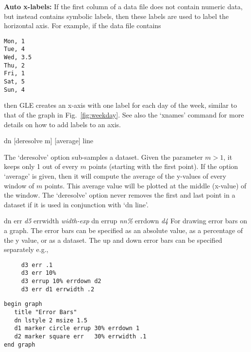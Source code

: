 \begin{commanddescription}
{\bf Auto x-labels:} If the first column of a data file does not contain numeric data, but instead contains symbolic labels, then these labels are used to label the horizontal axis. For example, if the data file contains

\begin{Verbatim}
Mon, 1
Tue, 4
Wed, 3.5
Thu, 2
Fri, 1
Sat, 5
Sun, 4
\end{Verbatim}

\noindent{}then GLE creates an x-axis with one label for each day of the week, similar to that of the graph in Fig.~\ref{fig:weekday}. See also the `{\sf xnames}' command for more details on how to add labels to an axis.


\item[{\sf dn [deresolve m] [average] line}]

The `{\sf deresolve}' option sub-samples a dataset. Given the parameter $m > 1$, it keeps only 1 out of every $m$ points (starting with the first point). If the option `{\sf average}' is given, then it will compute the average of the y-values of every window of $m$ points. This average value will be plotted at the middle (x-value) of the window. The `{\sf deresolve}' option never removes the first and last point in a dataset if it is used in conjunction with `{\sf dn line}'.

\item[{\sf dn err {\it d5} errwidth {\it width-exp} dn errup {\it nn\%} errdown {\it d4}} ]
   
For drawing error bars on a graph. The error bars can be specified as
an absolute value, as a percentage of the y value, or as a dataset.
The up and down error bars can be specified separately e.g.,

\preglecode{}
\begin{Verbatim}
     d3 err .1
     d3 err 10%
     d3 errup 10% errdown d2
     d3 err d1 errwidth .2
\end{Verbatim}
\postglecode{}

\begin{minipage}[c]{8cm}
\begin{Verbatim}
begin graph
   title "Error Bars"
   dn lstyle 2 msize 1.5
   d1 marker circle errup 30% errdown 1
   d2 marker square err   30% errwidth .1
end graph
\end{Verbatim}
\end{minipage}
\hfill
\begin{minipage}[c]{7cm}
\mbox{}
\end{minipage}


\end{commanddescription}
